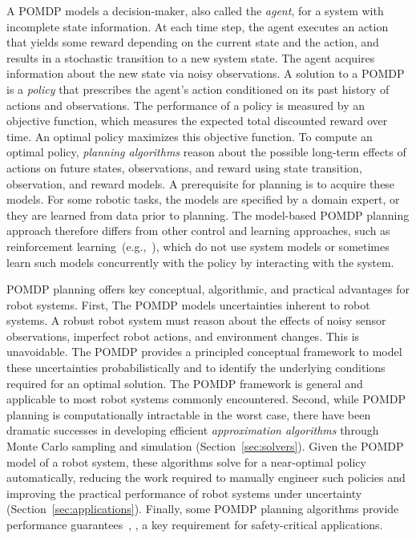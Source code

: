 \documentclass[journal]{IEEEtran}
\begin{document}
A POMDP models  a decision-maker, also called the \emph{agent}, for a system with {incomplete state information}.
%
At each  time step, the agent executes an action that yields {some} reward {depending} on the current state and the action, and results in a stochastic transition to a new {system} state.
The agent acquires information about the new state via noisy observations.
A solution to a POMDP is a \emph{policy} that prescribes the agent's action  conditioned on its past history of actions and observations.
%
The performance of a policy is measured by an objective function, which measures the expected total discounted {reward} over time.
An optimal policy maximizes this objective function.
To compute an optimal policy,  \emph{planning algorithms} reason about the possible long-term effects of actions on future states, observations, and { reward using state transition, observation, and reward models}.
{A prerequisite for planning is to acquire these models.
For some robotic tasks, the models {are} specified by a domain expert, or they {are} learned from data prior to planning.
The model-based POMDP planning approach therefore differs from other control and learning approaches, such as reinforcement learning~(e.g.,~\cite{kober2013reinforcement}), which do not use system models or sometimes learn such models concurrently with the policy by interacting with the system.}

%
POMDP planning {offers key conceptual, algorithmic, and practical advantages for robot systems.}
First, {The POMDP models uncertainties inherent to robot} systems. A robust robot system must reason  about the effects of noisy sensor observations, imperfect robot actions, and environment changes. This is unavoidable. The POMDP provides a principled conceptual framework to model these uncertainties probabilistically and to identify the underlying conditions required for an optimal solution. The POMDP framework is general and applicable to most  robot systems commonly encountered.
%
%
%
%
Second, while POMDP planning is computationally intractable in the worst case, there have been dramatic successes in developing  efficient \textit{approximation algorithms} through Monte Carlo sampling and simulation (Section~\ref{sec:solvers}).  Given the POMDP model of a robot system, these algorithms solve for a near-optimal policy automatically, reducing the work required to manually engineer such policies and  improving the practical performance of robot systems under uncertainty (Section~\ref{sec:applications}).
%
Finally, some POMDP planning algorithms provide performance guarantees~\cite{smith2005point,pineau2006anytime,somani2013despot}, {\cite{thiebaux2016rao}}, a key requirement for safety-critical applications.
\end{document}
